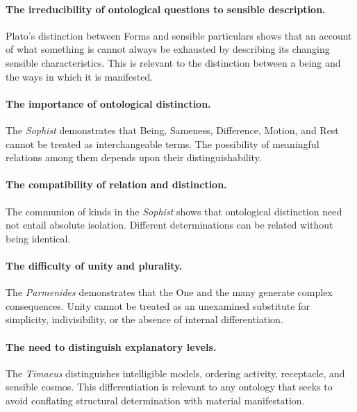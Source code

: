 \paragraph{The irreducibility of ontological questions to sensible description.}

Plato's distinction between Forms and sensible particulars shows
that an account of what something is cannot always be exhausted
by describing its changing sensible characteristics. This is
relevant to the distinction between a being and the ways in which
it is manifested.

\paragraph{The importance of ontological distinction.}

The \textit{Sophist} demonstrates that Being, Sameness, Difference,
Motion, and Rest cannot be treated as interchangeable terms.
The possibility of meaningful relations among them depends upon
their distinguishability.

\paragraph{The compatibility of relation and distinction.}

The communion of kinds in the \textit{Sophist} shows that ontological
distinction need not entail absolute isolation. Different
determinations can be related without being identical.

\paragraph{The difficulty of unity and plurality.}

The \textit{Parmenides} demonstrates that the One and the many
generate complex consequences. Unity cannot be treated as an
unexamined substitute for simplicity, indivisibility, or the
absence of internal differentiation.

\paragraph{The need to distinguish explanatory levels.}

The \textit{Timaeus} distinguishes intelligible models, ordering
activity, receptacle, and sensible cosmos. This differentiation
is relevant to any ontology that seeks to avoid conflating
structural determination with material manifestation.


